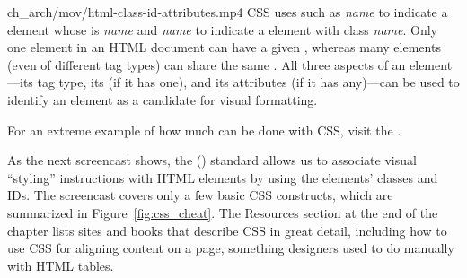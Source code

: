 %
{ch_arch/mov/html-class-id-attributes.mp4}{%
CSS uses  such as \emph{name} to
indicate a  element whose  is \emph{name} and
\emph{name} to indicate a  element with class \emph{name}.
Only one element in an HTML document can have a given , whereas many
elements (even of different tag types) can share the same .
All three aspects of an element---its tag type, its  (if it has
one), and its  attributes (if it has any)---can be used to
identify an element as a candidate for visual formatting.
}

\begin{sidebar}[0.7in]{}%
For an extreme example of how much can be done with CSS, visit the
  .
\end{sidebar}
%
As the next
screencast shows, the  () standard
allows us to associate visual ``styling'' instructions with HTML
elements by using the elements' classes and IDs.
The screencast covers
only a few basic CSS constructs, which are summarized in
Figure~\ref{fig:css_cheat}.  The Resources section at the end of the
chapter lists sites and books
that describe CSS in  great detail, including how to use CSS for aligning
content on a page, something designers used to do manually with HTML tables.



